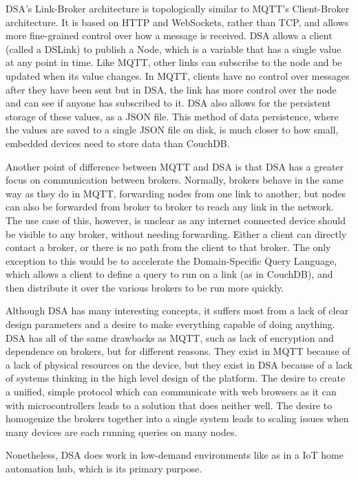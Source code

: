 \documentclass{article}
\begin{document}
DSA's Link-Broker architecture is topologically similar to MQTT's Client-Broker architecture. It is based on HTTP and WebSockets, rather than TCP, and allows more fine-grained control over how a message is received. DSA allows a client (called a DSLink) to publish a Node, which is a variable that has a single value at any point in time. Like MQTT, other links can subscribe to the node and be updated when its value changes. In MQTT, clients have no control over messages after they have been sent but in DSA, the link has more control over the node and can see if anyone has subscribed to it. DSA also allows for the persistent storage of these values, as a JSON file. This method of data persistence, where the values are saved to a single JSON file on disk, is much closer to how small, embedded devices need to store data than CouchDB.

Another point of difference between MQTT and DSA is that DSA has a greater focus on communication between brokers. Normally, brokers behave in the same way as they do in MQTT, forwarding nodes from one link to another, but nodes can also be forwarded from broker to broker to reach any link in the network. The use case of this, however, is unclear as any internet connected device should be visible to any broker, without needing forwarding. Either a client can directly contact a broker, or there is no path from the client to that broker. The only exception to this would be to accelerate the Domain-Specific Query Language, which allows a client to define a query to run on a link (as in CouchDB), and then distribute it over the various brokers to be run more quickly.

Although DSA has many interesting concepts, it suffers most from a lack of clear design parameters and a desire to make everything capable of doing anything. DSA has all of the same drawbacks as MQTT, such as lack of encryption and dependence on brokers, but for different reasons. They exist in MQTT because of a lack of physical resources on the device, but they exist in DSA because of a lack of systems thinking in the high level design of the platform. The desire to create a unified, simple protocol which can communicate with web browsers as it can with microcontrollers leads to a solution that does neither well. The desire to homogenize the brokers together into a single system leads to scaling issues when many devices are each running queries on many nodes. 

Nonetheless, DSA does work in low-demand environments like as in a IoT home automation hub, which is its primary purpose.
\end{document}
